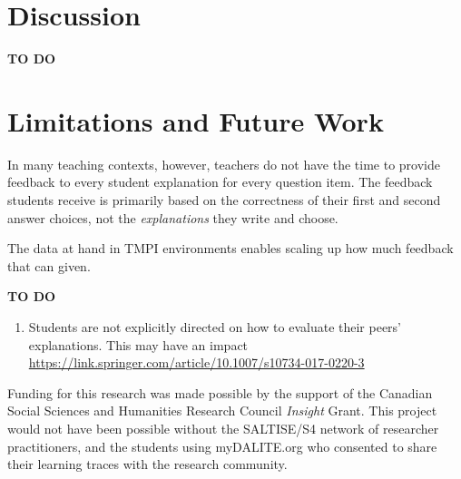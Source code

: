 \documentclass[sigconf]{acmart}
\begin{document}
\section{Discussion}
\textbf{TO DO}


\section{Limitations and Future Work}

In many teaching contexts, however, teachers do not have the time to provide 
feedback to every student explanation for every question item. 
The feedback students receive is primarily based on the correctness of their 
first and second answer choices, not the \textit{explanations} they write and 
choose.

The data at hand in TMPI environments enables scaling up how much feedback that 
can given.



\textbf{TO DO}

\begin{enumerate}
	\item Students are not explicitly directed on how to evaluate their peers' 
	explanations. This may have an impact 
	 \url{https://link.springer.com/article/10.1007/s10734-017-0220-3}
\end{enumerate}

\begin{acks}
Funding for this research was made possible by the support of the Canadian 
Social Sciences and Humanities Research Council \textit{Insight} Grant. This 
project would not have been possible without the SALTISE/S4 network of 
researcher practitioners, and the students using myDALITE.org who consented to 
share their learning traces with the research community.
\end{acks}



\end{document}

